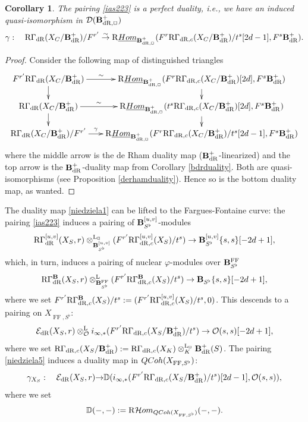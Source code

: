 \documentclass[10pt,reqno]{amsart}
\let\cal\mathcal
\newtheorem{corollary}[equation]{Corollary}
\theoremstyle{definition}
\theoremstyle{remark}
\def\phi{\varphi}
\newcommand{\dr}{\operatorname{dR} }
\newcommand{\uHom}{\underline{{\rm{Hom}} }}
\newcommand{\Hhom}{{\cal Hom}}
\newcommand{\LL}{\operatorname{L} }
\newcommand{\FF}{\operatorname{FF} }
\newcommand{\so}{{\mathcal O}}
\newcommand{\se}{{\mathcal{E}}}
\newcommand{\sd}{{\mathcal{D}}}
\numberwithin{equation}{section}
\def\R{{\mathrm R}}
\def\bD{${\mathbb D}$}
\numberwithin{equation}{section}
\begin{document}
 \begin{corollary} \label{bdrduality1} 
  The  pairing \eqref{ias223} is a perfect duality, i.e., we have an  induced quasi-isomorphism in $\sd(\B^+_{\dr,\Box})$
\begin{align}\label{niedziela1}
\gamma:\quad \R\Gamma_{\dr}(X_C/\B^+_{\dr})/F^{r^{\prime}}\stackrel{\sim}{\to} \R\uHom_{\B^+_{\dr,\Box}} (F^{r}\R\Gamma_{\dr,c}(X_C/\B^+_{\dr})/t^s[2d-1],F^s\B^+_{\dr}).
\end{align}
\end{corollary}
\begin{proof} Consider the following map of distinguished triangles
$$
\xymatrix@R=4mm@C=6mm{
F^{r^{\prime}}\R\Gamma_{\dr}(X_C/\B^+_{\dr})\ar[d] \ar[r]^-{\sim} & \R\uHom_{\B^+_{\dr,\Box}} (F^{r}\R\Gamma_{\dr,c}(X_C/\B^+_{\dr})[2d],F^s\B^+_{\dr})\ar[d]\\
\R\Gamma_{\dr}(X_C/\B^+_{\dr})\ar[d] \ar[r]^-{\sim} & \R\uHom_{\B^+_{\dr,\Box}} (t^s\R\Gamma_{\dr,c}(X_C/\B^+_{\dr})[2d],F^s\B^+_{\dr})\ar[d]\\
\R\Gamma_{\dr}(X_C/\B^+_{\dr})/F^{r^{\prime}}\ar[r]^-{\gamma} & \R\uHom_{\B^+_{\dr,\Box}} (F^{r}\R\Gamma_{\dr,c}(X_C/\B^+_{\dr})/t^s[2d-1],F^s\B^+_{\dr})
}
$$
where the middle arrow is the de Rham duality map ($\B^+_{\dr}$-linearized) and the top arrow is the $\B^+_{\dr}$-duality map from Corollary \ref{bdrduality}. Both are quasi-isomorphisms (see Proposition \ref{derhamduality}). Hence so is the bottom duality map, as wanted.
\end{proof}


   The duality map \eqref{niedziela1} can be lifted to the Fargues-Fontaine curve:  the pairing \eqref{ias223} induces a pairing of ${{\bf B}_{S^{\flat}}^{[u,v]}}$-modules 
 $$
 \R\Gamma^{{[u,v]}}_{\dr}(X_S,r)\otimes^{\LL_{\Box}}_{\B_{S^{\flat}}^{[u,v]}}(F^{r^{\prime}}\R\Gamma^{{[u,v]}}_{\dr,c}(X_S)/t^s)\to \B_{S^{\flat}}^{[u,v]}\{s,s\}[-2d+1], 
 $$
 which, in turn, induces a pairing of nuclear $\phi$-modules over $\B^{\FF}_{S^{\flat}}$
 $$
  \R\Gamma^{\B}_{\dr}(X_S,r)\otimes^{\LL}_{\B^{\FF}_{S^{\flat}}}(F^{r^{\prime}}\R\Gamma^{\B}_{\dr,c}(X_S)/t^s)\to\B_{S^{\flat}}\{s,s\}[-2d+1],
 $$
 where we set $F^{r^{\prime}}\R\Gamma^{\B}_{\dr,c}(X_S)/t^s:=(F^{r^{\prime}}\R\Gamma^{{[u,v]}}_{\dr,c}(X_S)/t^s,0)$. 
This descends to a pairing on $X_{\FF,S^{\flat}}$:
 \begin{equation}\label{niedziela5}
 \se_{\dr}(X_S,r)\otimes^{\LL}_{\so}i_{\infty,*}(F^{r^{\prime}}\R\Gamma_{\dr,c}(X_S/\B^+_{\dr})/t^s) \to \so(s,s)[-2d+1],
 \end{equation}
  where we set $\R\Gamma_{\dr,c}(X_S/\B^+_{\dr}):=\R\Gamma_{\dr,c}(X_K)\otimes^{\LL_{\Box}}_K\B^+_{\dr}(S)$.
The pairing \eqref{niedziela5}  induces a duality map in ${\rm QCoh}(X_{\FF,S^{\flat}})$: 
 \begin{equation}\label{niedziela3}
 \gamma_{X_S}:\quad  \se_{\dr}(X_S,r){\to} {\mathbb D}(i_{\infty,*}(F^{r^{\prime}}\R\Gamma_{\dr,c}(X_S/\B^+_{\dr})/t^s)[2d-1],\so(s,s)),
 \end{equation}
 where we \index{D@\bD}set 
$${\mathbb D}(-,-):=\R\Hhom_{{\rm QCoh}(X_{\FF,S^{\flat}})}(-,-).$$ 
 
\end{document}
